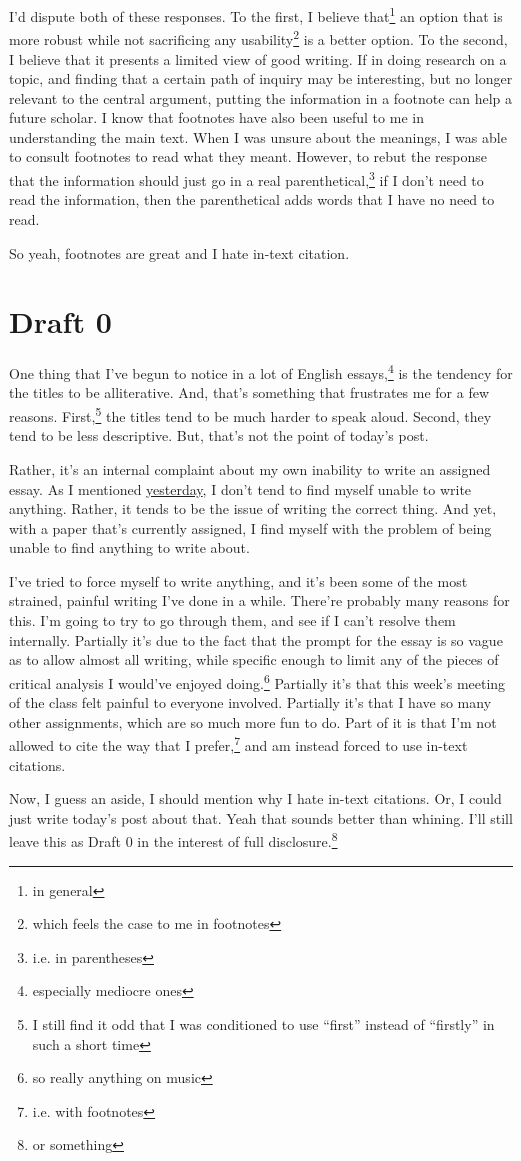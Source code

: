 \documentclass[12pt]{article}[titlepage]
\newcommand{\say}[1]{``#1''}
\newcommand{\1}{\={a}}
\newcommand{\2}{\={e}}
\newcommand{\3}{\={\i}}
\newcommand{\4}{\=o}
\newcommand{\5}{\=u}
\newcommand{\6}{\={A}}
\renewcommand{\,}{\textsuperscript{,}}
\begin{document}
I'd dispute both of these responses.
To the first, I believe that\footnote{in general} an option that is more robust while not sacrificing any usability\footnote{which feels the case to me in footnotes} is a better option.
To the second, I believe that it presents a limited view of good writing.
If in doing research on a topic, and finding that a certain path of inquiry may be interesting, but no longer relevant to the central argument, putting the information in a footnote can help a future scholar.
I know that footnotes have also been useful to me in understanding the main text.
When I was unsure about the meanings, I was able to consult footnotes to read what they meant.
However, to rebut the response that the information should just go in a real parenthetical,\footnote{i.e. in parentheses} if I don't need to read the information, then the parenthetical adds words that I have no need to read.

So yeah, footnotes are great and I hate in-text citation.

\section{Draft 0}
One thing that I've begun to notice in a lot of English essays,\footnote{especially mediocre ones} is the tendency for the titles to be alliterative.
And, that's something that frustrates me for a few reasons.
First,\footnote{I still find it odd that I was conditioned to use \say{first} instead of \say{firstly} in such a short time} the titles tend to be much harder to speak aloud.
Second, they tend to be less descriptive.
But, that's not the point of today's post.

Rather, it's an internal complaint about my own inability to write an assigned essay.
As I mentioned \href{writers-block.html}{yesterday}, I don't tend to find myself unable to write anything.
Rather, it tends to be the issue of writing the correct thing.
And yet, with a paper that's currently assigned, I find myself with the problem of being unable to find anything to write about.

I've tried to force myself to write anything, and it's been some of the most strained, painful writing I've done in a while.
There're probably many reasons for this.
I'm going to try to go through them, and see if I can't resolve them internally.
Partially it's due to the fact that the prompt for the essay is so vague as to allow almost all writing, while specific enough to limit any of the pieces of critical analysis I would've enjoyed doing.\footnote{so really anything on music}
Partially it's that this week's meeting of the class felt painful to everyone involved.
Partially it's that I have so many other assignments, which are so much more fun to do.
Part of it is that I'm not allowed to cite the way that I prefer,\footnote{i.e. with footnotes} and am instead forced to use in-text citations.

Now, I guess an aside, I should mention why I hate in-text citations.
Or, I could just write today's post about that.
Yeah that sounds better than whining.
I'll still leave this as Draft 0 in the interest of full disclosure.\footnote{or something}
\end{document}
